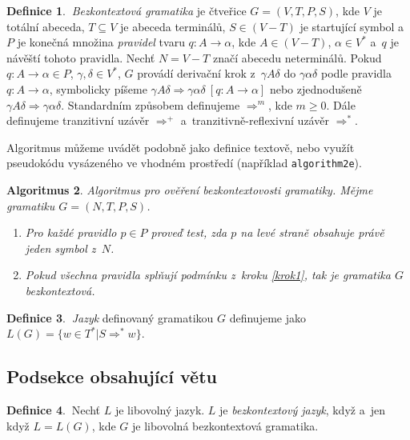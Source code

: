 \documentclass[a4paper, 11pt, twocolumn]{article}
\theoremstyle{definition}
\newtheorem{mydef}{Definice}[section]
\theoremstyle{plain}
\newtheorem{myalg}[mydef]{Algoritmus}
\begin{document}
\begin{mydef}\label{def1.1}
$\:$\emph{Bezkontextová gramatika} je čtveřice $G=(V,T,P,S)$, kde $V$ je totální abeceda,
$T\subseteq V$ je abeceda terminálů, $S\in (V - T)$ je startující symbol a~$P$ je konečná množina \emph{pravidel}
tvaru $q\colon A\rightarrow\alpha$, kde $A\in (V - T)$, $\alpha\in V^*$ a~$q$ je návěští tohoto pra\-vi\-dla. Nechť $N=V-T$ značí abecedu neterminálů.
Po\-kud $q\colon A\rightarrow\alpha\in P$, $\gamma, \delta\in V^*$, $G$ provádí derivační krok z~$\gamma A\delta$ do $\gamma\alpha\delta$ podle pravidla $q\colon A\rightarrow\alpha$, sym\-bolicky píšeme $\gamma A\delta\Rightarrow\gamma\alpha\delta\ [q\colon A\rightarrow\alpha]$ nebo zjed\-noduše\-ně $\gamma A\delta\Rightarrow\gamma\alpha\delta$. Standardním způsobem definu\-jeme $\Rightarrow^m$, kde $m\ge 0$. Dále definujeme 
tranzitivní uzávěr $\Rightarrow^+$ a~tranzitivně-reflexivní uzávěr $\Rightarrow^*$.
\end{mydef}

Algoritmus můžeme uvádět podobně jako definice \mbox{textově}, nebo využít pseudokódu vysázeného ve vhodném prostředí (například \texttt{algorithm2e}).

\begin{myalg}
Algoritmus pro ověření bezkontextovosti gramatiky. Mějme gramatiku $G=(N,T,P,S)$.
\begin{enumerate}
\item \label{krok1}Pro každé pravidlo $p\in P$ proveď test, zda $p$ na levé straně obsahuje právě jeden symbol z~$N$.
\item Pokud všechna pravidla splňují podmínku z~kroku \ref{krok1}, tak je gramatika $G$ bezkontextová.
\end{enumerate}
\end{myalg}

\begin{mydef}
$\:$\emph{Jazyk} definovaný gramatikou $G$ definujeme jako $L(G)=\{w\in T^*|S\Rightarrow^*w\}$.
\end{mydef}

\subsection{Podsekce obsahující větu}

\begin{mydef}
$\:$Nechť $L$ je libovolný jazyk. $L$ je \emph{bezkontextový jazyk}, když a~jen když $L=L(G)$, kde $G$ je libovolná bezkontextová gramatika.
\end{mydef}
\end{document}
